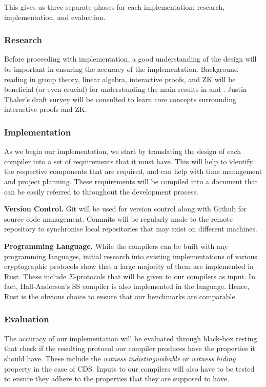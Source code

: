 This gives us three separate phases for each implementation: research, implementation, and evaluation.

\subsubsection{Research}
Before proceeding with implementation, a good understanding of the design will be important in ensuring the accuracy of the implementation. Background reading in group theory, linear algebra, interactive proofs, and ZK will be beneficial (or even crucial) for understanding the main results in \cite{CDS94} and \cite{StackingSigmas}. Justin Thaler's draft survey \cite{PAZK} will be consulted to learn core concepts surrounding interactive proofs and ZK. 

\subsubsection{Implementation}
As we begin our implementation, we start by translating the design of each compiler into a set of requirements that it must have. This will help to identify the respective components that are required, and can help with time management and project planning. These requirements will be compiled into a document that can be easily referred to throughout the development process. 

\textbf{Version Control.} Git will be used for version control along with Github for source code management. Commits will be regularly made to the remote repository to synchronise local repositories that may exist on different machines. 

\textbf{Programming Language.} While the compilers can be built with any programming languages, initial research into existing implementations of various cryptographic protocols show that a large majority of them are implemented in Rust. These include $\Sigma$-protocols that will be given to our compilers as input. In fact, Hall-Andersen's SS compiler is also implemented in the language. Hence, Rust is the obvious choice to ensure that our benchmarks are comparable. 

\subsubsection{Evaluation}
The accuracy of our implementation will be evaluated through black-box testing that check if the resulting protocol our compiler produces have the properties it should have. These include the \textit{witness indistinguishable} or \textit{witness hiding} property in the case of CDS. Inputs to our compilers will also have to be tested to ensure they adhere to the properties that they are supposed to have. 

